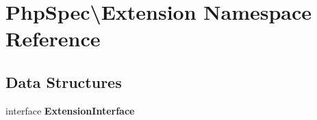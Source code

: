 \section{Php\+Spec\textbackslash{}Extension Namespace Reference}
\label{namespace_php_spec_1_1_extension}
\subsection*{Data Structures}
\begin{DoxyCompactItemize}
\item 
interface {\bf Extension\+Interface}
\end{DoxyCompactItemize}
